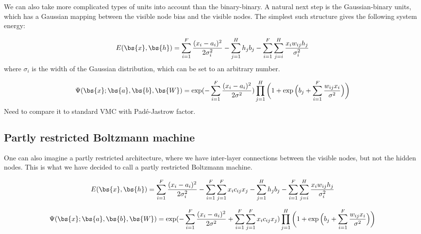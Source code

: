 

We can also take more complicated types of units into account than the binary-binary. A natural next step is the Gaussian-binary units, which has a Gaussian mapping between the visible node bias and the visible nodes. The simplest such structure gives the following system energy:

\begin{equation}
E(\bs{x},\bs{h})= \sum_{i=1}^F\frac{(x_i-a_i)^2}{2\sigma_i^2} - \sum_{j=1}^Hh_jb_j-\sum_{i=1}^F\sum_{j=i}^H \frac{x_iw_{ij}h_j}{\sigma_i^2} 
\label{eq:gaussianbinary}
\end{equation}
where $\sigma_i$ is the width of the Gaussian distribution, which can be set to an arbitrary number. 

\begin{equation}
\Psi(\bs{x};\bs{a},\bs{b},\bs{W})=\exp(-\sum_{i=1}^F\frac{(x_i-a_i)^2}{2\sigma^2})\prod_{j=1}^H\bigg(1+\exp\Big(b_j+\sum_{i=1}^F\frac{w_{ij}x_i}{\sigma^2}\Big)\bigg)
\label{eq:NQSWF}
\end{equation}
Need to compare it to standard VMC with Padé-Jastrow factor. 

\subsection{Partly restricted Boltzmann machine}
One can also imagine a partly restricted architecture, where we have inter-layer connections between the visible nodes, but not the hidden nodes. This is what we have decided to call a partly restricted Boltzmann machine. 



\begin{equation}
E(\bs{x},\bs{h})= \sum_{i=1}^F\frac{(x_i-a_i)^2}{2\sigma_i^2} - \sum_{i=1}^F\sum_{j=1}^Fx_ic_{ij}x_j- \sum_{j=1}^Hh_jb_j-\sum_{i=1}^F\sum_{j=i}^H \frac{x_iw_{ij}h_j}{\sigma_i^2} 
\label{eq:partlygaussianbinary}
\end{equation}

\begin{equation}
\Psi(\bs{x};\bs{a},\bs{b},\bs{W})=\exp(-\sum_{i=1}^F\frac{(x_i-a_i)^2}{2\sigma^2}+\sum_{i=1}^F\sum_{j=1}^Fx_ic_{ij}x_j)\prod_{j=1}^H\bigg(1+\exp\Big(b_j+\sum_{i=1}^F\frac{w_{ij}x_i}{\sigma^2}\Big)\bigg)
\label{eq:PNQSWF}
\end{equation}

